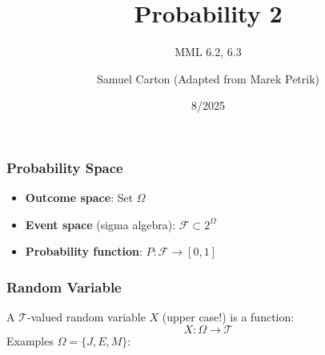 \documentclass{beamer}
\title{Probability 2}
\subtitle{MML 6.2, 6.3}
\author{Samuel Carton (Adapted from Marek Petrik)}
\date{8/2025}
\begin{document}
\begin{frame}
\maketitle
\end{frame}

\begin{frame} \frametitle{Probability Space}
\begin{itemize}
\item \textbf{Outcome space}: Set $\Omega$
  \vfill 
\item \textbf{Event space} (sigma algebra): $\mathcal{F} \subset 2^{\Omega}$
  \vfill
\item \textbf{Probability function}: $P \colon \mathcal{F} \to [0,1]$
\end{itemize}
\end{frame}

\begin{frame} \frametitle{Random Variable}
  A $\mathcal{T}$-valued random variable $X$ (upper case!) is a function:
  \[ X \colon \Omega \to \mathcal{T}\]
    Examples \( \Omega = \{ J, E, M \} \):
    \vspace{4cm}
\end{frame}
\end{document}
